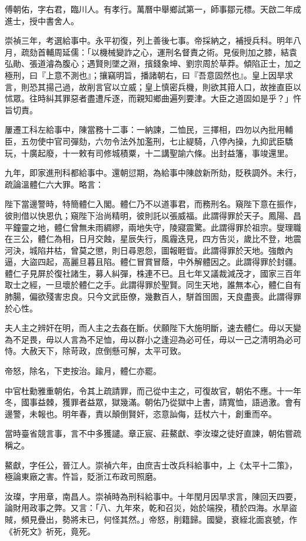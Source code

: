 \begin{pinyinscope}
傅朝佑，字右君，臨川人。有孝行。萬曆中舉鄉試第一，師事鄒元標。天啟二年成進士，授中書舍人。

崇禎三年，考選給事中。永平初復，列上善後七事。帝採納之，補授兵科。明年八月，疏劾首輔周延儒：「以機械變詐之心，運刑名督責之術。見佞則加之膝，結袁弘勛、張道濬為腹心；遇賢則墜之淵，擯錢象坤、劉宗周於草莽。傾陷正士，加之極刑，曰『上意不測也』；攘竊明旨，播諸朝右，曰『吾意固然也』。皇上因旱求言，則恐其揚己過，故削言官以立威；皇上慎密兵機，則欲其箝人口，故挫直臣以怵眾。往時糾其罪惡者盡遭斥逐，而親知鄉曲遍列要津。大臣之道固如是乎？」忤旨切責。

屢遷工科左給事中，陳當務十二事：一納諫，二恤民，三擇相，四勿以內批用輔臣，五勿使中官司彈劾，六勿令法外加濫刑，七止緹騎，八停內操，九抑武臣驕玩，十廣起廢，十一敕有司修城積粟，十二講聖諭六條。出封益籓，事竣還里。

九年，即家進刑科都給事中。還朝愆期，為給事中陳啟新所劾，貶秩調外。未行，疏論溫體仁六大罪。略言：

陛下當邊警時，特簡體仁入閣。體仁乃不以道事君，而務刑名。窺陛下意在振作，彼則借以快恩仇；窺陛下治尚精明，彼則託以張威福。此謂得罪於天子。鳳陽、昌平鐘靈之地，體仁曾無未雨綢繆，兩地失守，陵寢震驚。此謂得罪於祖宗。燮理職在三公，體仁為相，日月交蝕，星辰失行，風霾迭見，四方告災，歲比不登，地震河決，城陷井枯，曾莫之懲，則日尋恩怨，圖報睚眥。此謂得罪於天地。強敵內逼，大盜四起，高麗旦暮且陷。體仁冒賞冒蔭，中外解體因之。此謂得罪於封疆。體仁子見屏於復社諸生，募人糾彈，株連不已。且七年又議裁減茂才，國家三百年取士之經，一旦壞於體仁之手。此謂得罪於聖賢。同生天地，誰無本心，體仁自有肺腸，偏欲殘害忠良。只今文武臣僚，幾數百人，駢首囹圄，天良盡喪。此謂得罪於心性。

夫人主之辨奸在明，而人主之去姦在斷。伏願陛下大施明斷，速去體仁。毋以天變為不足畏，毋以人言為不足恤，毋以群小之逢迎為必可任，毋以一己之清明為必可恃。大赦天下，除苛政，庶倒懸可解，太平可致。

帝怒，除名，下吏按治。踰月，體仁亦罷。

中官杜勳雅重朝佑，令其上疏請罪，而己從中主之，可復故官，朝佑不應。十一年冬，國事益棘，獲罪者益眾，獄幾滿。朝佑乃從獄中上書，請寬恤，語過激。會有邊警，未報也。明年春，責以顛倒賢奸，恣意訕侮，廷杖六十，創重而卒。

當時臺省競言事，言不中多獲譴。章正宸、莊鰲獻、李汝璨之徒好直諫，朝佑嘗疏稱之。

鰲獻，字任公，晉江人。崇禎六年，由庶吉士改兵科給事中，上《太平十二策》，極論東廠之害。忤旨，貶浙江布政司照磨。

汝璨，字用章，南昌人。崇禎時為刑科給事中。十年閏月因旱求言，陳回天四要，論財用政事之弊。又言：「八、九年來，乾和召災，始於端揆，積於四海。水旱盜賊，頻見疊出，勢將未已，何怪其然。」帝怒，削籍歸。國變，衰絰北面哀號，作《祈死文》祈死，竟死。


\end{pinyinscope}
